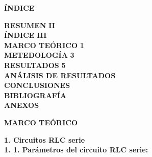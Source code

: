 \documentclass[12pt]{article}
\begin{document}
    \newpage
    
    \begin{center}
        \textbf{\large ÍNDICE}\\
    \end{center}
    
    \noindent \textbf{RESUMEN} \hfill \textbf{II}\\
    \noindent \textbf{ÍNDICE} \hfill \textbf{III}\\
    \noindent \textbf{MARCO TEÓRICO} \hfill \textbf{1}\\
    \noindent \textbf{METEDOLOGÍA} \hfill \textbf{3}\\
    \noindent \textbf{RESULTADOS} \hfill \textbf{5}\\
    \noindent \textbf{ANÁLISIS DE RESULTADOS} \hfill \textbf{}\\
    \noindent \textbf{CONCLUSIONES} \hfill \textbf{}\\
    \noindent \textbf{BIBLIOGRAFÍA} \hfill \textbf{}\\
    \noindent \textbf{ANEXOS} \hfill \textbf{}\\
    
    \newpage
    
    
    \begin{center}
        \textbf{\large MARCO TEÓRICO}\\
    \end{center}
    
    \textbf{1. Circuitos RLC serie}\\

    \textbf{1. 1. Parámetros del circuito RLC serie:}
\end{document}

